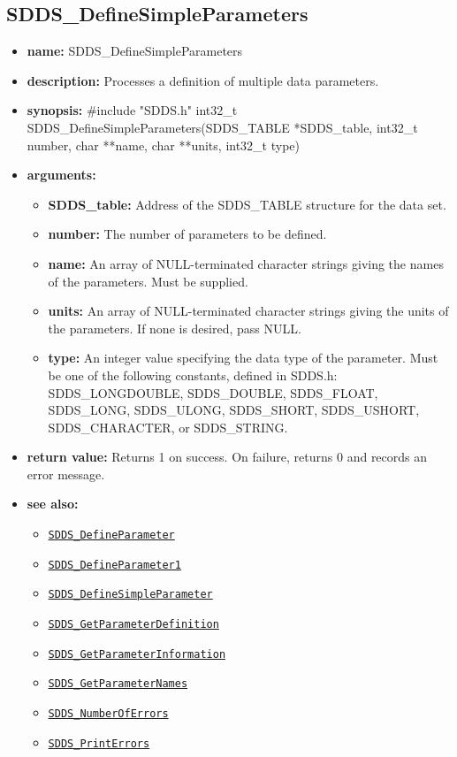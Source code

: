 \documentclass[11pt]{article}
\newcommand{\progref}[1]{\hyperref[SDDS_#1]{\tt SDDS\_#1}}
\begin{document}
\subsection{SDDS\_DefineSimpleParameters}
\label{SDDS_DefineSimpleParameters}

\begin{itemize}
\item {\bf name:}\newline
SDDS\_DefineSimpleParameters
\item {\bf description:}\newline
Processes a definition of multiple data parameters.
\item {\bf synopsis:} \#include "SDDS.h"\newline
int32\_t SDDS\_DefineSimpleParameters(SDDS\_TABLE *SDDS\_table, int32\_t number, char **name, char **units, int32\_t type)
\item {\bf arguments:}
\begin{itemize}
\item {\bf SDDS\_table:} Address of the SDDS\_TABLE structure for the data set.
\item {\bf number:} The number of parameters to be defined.
\item {\bf name:} An array of NULL-terminated character strings giving the names of the parameters. Must be supplied.
\item {\bf units:} An array of NULL-terminated character strings giving the units of the parameters. If none is desired, pass NULL.
\item {\bf type:} An integer value specifying the data type of the parameter. Must be one of the following constants, defined in  SDDS.h: SDDS\_LONGDOUBLE, SDDS\_DOUBLE, SDDS\_FLOAT, SDDS\_LONG, SDDS\_ULONG, SDDS\_SHORT, SDDS\_USHORT, SDDS\_CHARACTER, or SDDS\_STRING.
\end{itemize}
\item {\bf return value:}\newline
Returns 1 on success. On failure, returns 0 and records an error message.
\item {\bf see also:}
\begin{itemize}
\item \progref{DefineParameter}
\item \progref{DefineParameter1}
\item \progref{DefineSimpleParameter}
\item \progref{GetParameterDefinition}
\item \progref{GetParameterInformation}
\item \progref{GetParameterNames}
\item \progref{NumberOfErrors}
\item \progref{PrintErrors}
\end{itemize}
\end{itemize}
\end{document}
